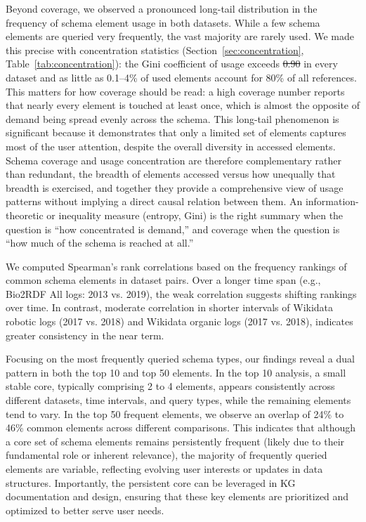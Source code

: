 \documentclass[sw]{iosart2x}
\providecommand{\DIFadd}[1]{{\protect\color{blue}\uwave{#1}}} %
\providecommand{\DIFdel}[1]{{\protect\color{red}\sout{#1}}} %
\providecommand{\DIFaddbegin}{} %
\providecommand{\DIFaddend}{} %
\providecommand{\DIFdelbegin}{} %
\providecommand{\DIFdelend}{} %
\providecommand{\DIFscaledelfig}{0.5}
\newlength{\DIFdelgraphicswidth} %
\newlength{\DIFdelgraphicsheight} %
\providecommand{\DIFaddincludegraphics}[2][]{{\color{blue}\fbox{\DIFOincludegraphics[#1]{#2}}}} %
\providecommand{\DIFdelincludegraphics}[2][]{%
\sbox{\DIFdelgraphicsbox}{\DIFOincludegraphics[#1]{#2}}%
\settoboxwidth{\DIFdelgraphicswidth}{\DIFdelgraphicsbox} %
\settoboxtotalheight{\DIFdelgraphicsheight}{\DIFdelgraphicsbox} %
\scalebox{\DIFscaledelfig}{%
\parbox[b]{\DIFdelgraphicswidth}{\usebox{\DIFdelgraphicsbox}\\[-\baselineskip] \rule{\DIFdelgraphicswidth}{0em}}\llap{\resizebox{\DIFdelgraphicswidth}{\DIFdelgraphicsheight}{%
\setlength{\unitlength}{\DIFdelgraphicswidth}%
\begin{picture}(1,1)%
\thicklines\linethickness{2pt} %
{\color[rgb]{1,0,0}\put(0,0){\framebox(1,1){}}}%
{\color[rgb]{1,0,0}\put(0,0){\line( 1,1){1}}}%
{\color[rgb]{1,0,0}\put(0,1){\line(1,-1){1}}}%
\end{picture}%
}\hspace*{3pt}}} %
} %
\DeclareRobustCommand{\DIFaddbegin}{\DIFOaddbegin \let\includegraphics\DIFaddincludegraphics} %
\DeclareRobustCommand{\DIFaddend}{\DIFOaddend \let\includegraphics\DIFOincludegraphics} %
\DeclareRobustCommand{\DIFdelbegin}{\DIFOdelbegin \let\includegraphics\DIFdelincludegraphics} %
\DeclareRobustCommand{\DIFdelend}{\DIFOaddend \let\includegraphics\DIFOincludegraphics} %
\begin{document}
Beyond coverage, we observed a pronounced long-tail distribution in the frequency of schema element usage in both datasets. While a few schema elements are queried very frequently, the vast majority are rarely used. We made this precise with concentration statistics (Section~\ref{sec:concentration}, Table~\ref{tab:concentration}): the Gini coefficient of usage exceeds \DIFdelbegin \DIFdel{0.90 }\DIFdelend \DIFaddbegin \DIFadd{0.91 }\DIFaddend in every dataset \DIFaddbegin \DIFadd{except the very sparse }\emph{\DIFadd{Bio2RDF-organic-2019}} \DIFadd{log, }\DIFaddend and as little as 0.1--4\% of used elements account for 80\% of all references. This matters for how coverage should be read: a high coverage number reports that nearly every element is touched at least once, which is almost the opposite of demand being spread evenly across the schema. This long-tail phenomenon is significant because it demonstrates that only a limited set of elements captures most of the user attention, despite the overall diversity in accessed elements. Schema coverage and usage concentration are therefore complementary rather than redundant, the breadth of elements accessed versus how unequally that breadth is exercised, and together they provide a comprehensive view of usage patterns without implying a direct causal relation between them. An information-theoretic or inequality measure (entropy, Gini) is the right summary when the question is ``how concentrated is demand,'' and coverage when the question is ``how much of the schema is reached at all.''

We computed Spearman’s rank correlations based on the frequency rankings of common schema elements in dataset pairs. Over a longer time span (e.g., Bio2RDF All logs: 2013 vs. 2019), the weak correlation suggests shifting rankings over time. In contrast, moderate correlation in shorter intervals of Wikidata robotic logs (2017 vs. 2018) and Wikidata organic logs (2017 vs. 2018), indicates greater consistency in the near term.

Focusing on the most frequently queried schema types, our findings reveal a dual pattern in both the top 10 and top 50 elements. In the top 10 analysis, a small stable core, typically comprising 2 to 4 elements, appears consistently across different datasets, time intervals, and query types, while the remaining elements tend to vary. In the top 50 frequent elements, we observe an overlap of 24\% to 46\% common elements across different comparisons. This indicates that although a core set of schema elements remains persistently frequent (likely due to their fundamental role or inherent relevance), the majority of frequently queried elements are variable, reflecting evolving user interests or updates in data structures. Importantly, the persistent core can be leveraged in KG documentation and design, ensuring that these key elements are prioritized and optimized to better serve user needs.
\end{document}
